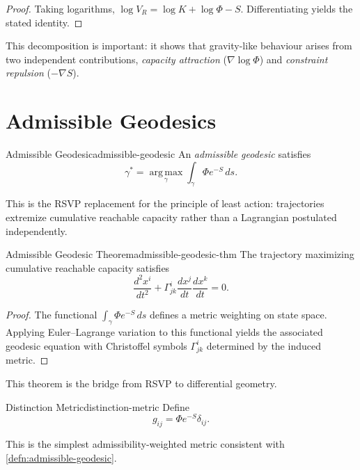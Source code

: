 \documentclass[12pt,twoside,openright]{book}
\begin{document}
\begin{proof}
  Taking logarithms, $\log V_R = \log K + \log\Phi - S$.
  Differentiating yields the stated identity.
\end{proof}

This decomposition is important: it shows that
gravity-like behaviour arises from two independent
contributions, \emph{capacity attraction} ($\nabla\log\Phi$)
and \emph{constraint repulsion} ($-\nabla S$).

\section{Admissible Geodesics}
\label{sec:ch17-geodesics}

\begin{definition}{Admissible Geodesic}{admissible-geodesic}
  An \emph{admissible geodesic} satisfies
  \[
    \gamma^* = \operatorname*{arg\,max}_\gamma
    \int_\gamma \Phi e^{-S} \, ds.
  \]
\end{definition}

This is the RSVP replacement for the principle of least
action: trajectories extremize cumulative reachable
capacity rather than a Lagrangian postulated independently.

\begin{theorem}{Admissible Geodesic Theorem}{admissible-geodesic-thm}
  The trajectory maximizing cumulative reachable capacity
  satisfies
  \[
    \frac{d^2 x^i}{dt^2}
    + \Gamma^i_{jk}\frac{dx^j}{dt}\frac{dx^k}{dt} = 0.
  \]
\end{theorem}

\begin{proof}
  The functional $\int_\gamma \Phi e^{-S}\,ds$ defines a
  metric weighting on state space. Applying Euler--Lagrange
  variation to this functional yields the associated
  geodesic equation with Christoffel symbols
  $\Gamma^i_{jk}$ determined by the induced metric.
\end{proof}

This theorem is the bridge from RSVP to differential
geometry.

\begin{definition}{Distinction Metric}{distinction-metric}
  Define
  \[
    g_{ij} = \Phi e^{-S} \delta_{ij}.
  \]
\end{definition}

This is the simplest admissibility-weighted metric
consistent with \cref{defn:admissible-geodesic}.
\end{document}
